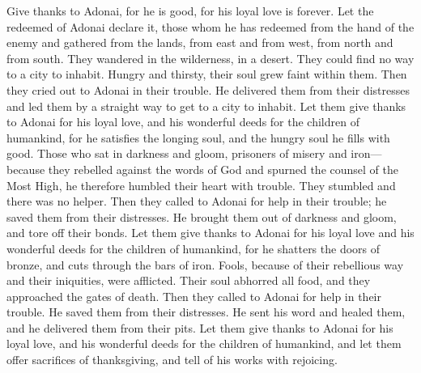 \begin{biblechapter} %
 Give thanks to Adonai, for he is good, 
for his loyal love is forever.
\verse Let the redeemed of Adonai declare it, 
those whom he has redeemed from the hand of the enemy
\verse and gathered from the lands, 
from east and from west, from north and from south.
\verse They wandered in the wilderness, in a desert. 
They could find no way to a city to inhabit.
\verse Hungry and thirsty, 
their soul grew faint within them.
\verse Then they cried out to Adonai in their trouble. 
He delivered them from their distresses
\verse and led them by a straight way 
to get to a city to inhabit.
\verse Let them give thanks to Adonai for his loyal love, 
and his wonderful deeds for the children of humankind,
\verse for he satisfies the longing soul, 
and the hungry soul he fills with good.
\verse Those who sat in darkness and gloom, 
prisoners of misery and iron—
\verse because they rebelled against the words of God 
and spurned the counsel of the Most High,
\verse he therefore humbled their heart with trouble. 
They stumbled and there was no helper.
\verse Then they called to Adonai for help in their trouble; 
he saved them from their distresses.
\verse He brought them out of darkness and gloom, 
and tore off their bonds.
\verse Let them give thanks to Adonai for his loyal love 
and his wonderful deeds for the children of humankind,
\verse for he shatters the doors of bronze, 
and cuts through the bars of iron.
\verse Fools, because of their rebellious way 
and their iniquities, were afflicted.
\verse Their soul abhorred all food, 
and they approached the gates of death.
\verse Then they called to Adonai for help in their trouble. 
He saved them from their distresses.
\verse He sent his word and healed them, 
and he delivered them from their pits.
\verse Let them give thanks to Adonai for his loyal love, 
and his wonderful deeds for the children of humankind,
\verse and let them offer sacrifices of thanksgiving, 
and tell of his works with rejoicing.

\end{biblechapter}
